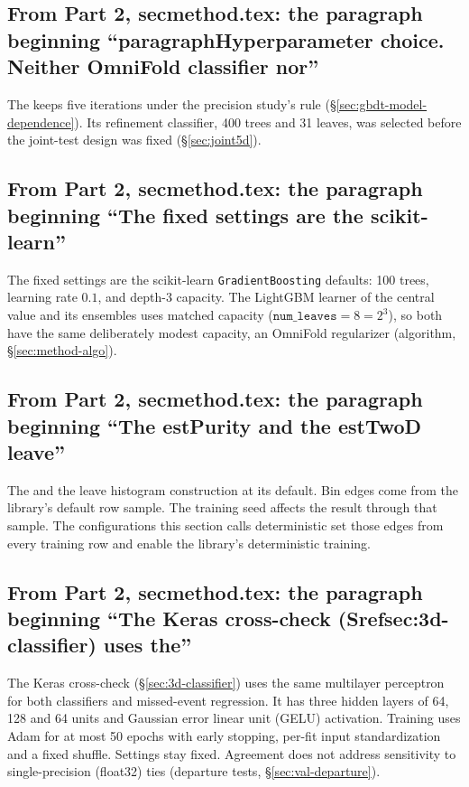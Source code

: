 \subsection{From Part 2, secmethod.tex: the paragraph beginning ``paragraphHyperparameter choice. Neither OmniFold classifier nor''}
The \estMultiD{} keeps five iterations under the precision study's rule (\S\ref{sec:gbdt-model-dependence}). Its refinement classifier, 400 trees and 31 leaves, was selected before the joint-test design was fixed (\S\ref{sec:joint5d}).

\subsection{From Part 2, secmethod.tex: the paragraph beginning ``The fixed settings are the scikit-learn''}
The fixed settings are the scikit-learn \texttt{GradientBoosting} defaults: 100 trees, learning rate $0.1$, and depth-3 capacity. The LightGBM learner of the central value and its ensembles uses matched capacity ($\texttt{num\_leaves}=8=2^{3}$), so both have the same deliberately modest capacity, an OmniFold regularizer (algorithm, \S\ref{sec:method-algo}).

\subsection{From Part 2, secmethod.tex: the paragraph beginning ``The estPurity and the estTwoD leave''}
The \estPurity{} and the \estTwoD{} leave histogram construction at its default. Bin edges come from the library's default row sample. The training seed affects the result through that sample. The configurations this section calls deterministic set those edges from every training row and enable the library's deterministic training.

\subsection{From Part 2, secmethod.tex: the paragraph beginning ``The Keras cross-check (Srefsec:3d-classifier) uses the''}
The Keras cross-check (\S\ref{sec:3d-classifier}) uses the same multilayer perceptron for both classifiers and missed-event regression. It has three hidden layers of 64, 128 and 64 units and Gaussian error linear unit (GELU) activation. Training uses Adam for at most 50 epochs with early stopping, per-fit input standardization and a fixed shuffle. Settings stay fixed. Agreement does not address sensitivity to single-precision (float32) ties (departure tests, \S\ref{sec:val-departure}).

